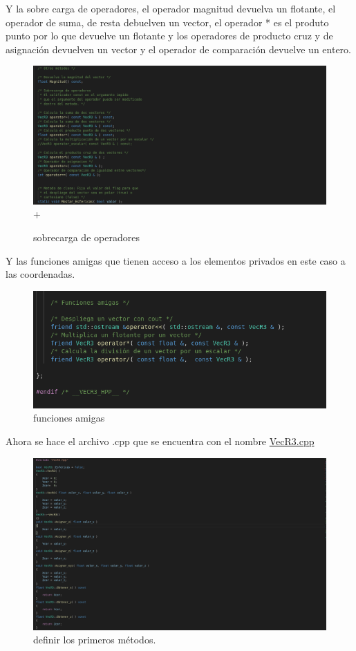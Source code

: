 \documentclass[11pt]{article}
\begin{document}
	
	Y la sobre carga de operadores, el operador magnitud devuelva un flotante, el operador de suma, de resta debuelven un vector, el operador * es el produto punto por lo que devuelve un flotante y los operadores de producto cruz y de asignación devuelven un vector y el operador de comparación devuelve un entero.
	
	\begin{figure}[H]
		\centering
		\includegraphics[width=0.7\linewidth]{img2}+
		\caption{sobrecarga de operadores}
	\end{figure}

	Y las funciones amigas que tienen acceso a los
	elementos privados en este caso a las coordenadas.
	
	
	\begin{figure}[H]
		\centering
		\includegraphics[width=0.7\linewidth]{img3}
		\caption{funciones amigas}
	\end{figure}
	
	Ahora se hace el archivo .cpp que se encuentra con el nombre \href{https://github.com/Mohs9/Lab-Avanzado/blob/eee254f75da3f1da0648a65ce5d045611bca5708/Tareas/T1_II_3/VecR3.cpp}{VecR3.cpp}
	
	\begin{figure}[H]
		\centering
		\includegraphics[width=0.7\linewidth]{img4}
		\caption{definir los primeros métodos. }
	\end{figure}
	
\end{document}
